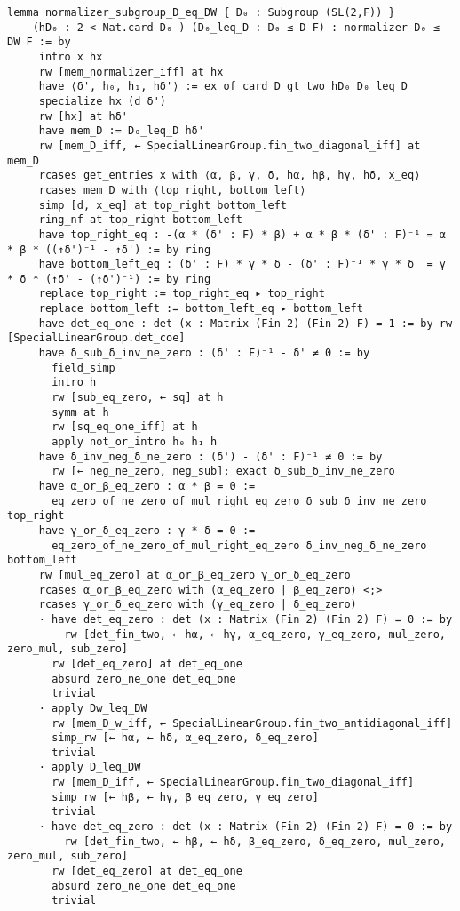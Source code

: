 \begin{footnotesize}
\begin{verbatim}
lemma normalizer_subgroup_D_eq_DW { D₀ : Subgroup (SL(2,F)) }
    (hD₀ : 2 < Nat.card D₀ ) (D₀_leq_D : D₀ ≤ D F) : normalizer D₀ ≤ DW F := by
     intro x hx
     rw [mem_normalizer_iff] at hx
     have ⟨δ', h₀, h₁, hδ'⟩ := ex_of_card_D_gt_two hD₀ D₀_leq_D
     specialize hx (d δ')
     rw [hx] at hδ'
     have mem_D := D₀_leq_D hδ'
     rw [mem_D_iff, ← SpecialLinearGroup.fin_two_diagonal_iff] at mem_D
     rcases get_entries x with ⟨α, β, γ, δ, hα, hβ, hγ, hδ, x_eq⟩
     rcases mem_D with ⟨top_right, bottom_left⟩
     simp [d, x_eq] at top_right bottom_left
     ring_nf at top_right bottom_left
     have top_right_eq : -(α * (δ' : F) * β) + α * β * (δ' : F)⁻¹ = α * β * ((↑δ')⁻¹ - ↑δ') := by ring
     have bottom_left_eq : (δ' : F) * γ * δ - (δ' : F)⁻¹ * γ * δ  = γ * δ * (↑δ' - (↑δ')⁻¹) := by ring
     replace top_right := top_right_eq ▸ top_right
     replace bottom_left := bottom_left_eq ▸ bottom_left
     have det_eq_one : det (x : Matrix (Fin 2) (Fin 2) F) = 1 := by rw [SpecialLinearGroup.det_coe]
     have δ_sub_δ_inv_ne_zero : (δ' : F)⁻¹ - δ' ≠ 0 := by
       field_simp
       intro h
       rw [sub_eq_zero, ← sq] at h
       symm at h
       rw [sq_eq_one_iff] at h
       apply not_or_intro h₀ h₁ h
     have δ_inv_neg_δ_ne_zero : (δ') - (δ' : F)⁻¹ ≠ 0 := by
       rw [← neg_ne_zero, neg_sub]; exact δ_sub_δ_inv_ne_zero
     have α_or_β_eq_zero : α * β = 0 :=
       eq_zero_of_ne_zero_of_mul_right_eq_zero δ_sub_δ_inv_ne_zero top_right
     have γ_or_δ_eq_zero : γ * δ = 0 :=
       eq_zero_of_ne_zero_of_mul_right_eq_zero δ_inv_neg_δ_ne_zero bottom_left
     rw [mul_eq_zero] at α_or_β_eq_zero γ_or_δ_eq_zero
     rcases α_or_β_eq_zero with (α_eq_zero | β_eq_zero) <;>
     rcases γ_or_δ_eq_zero with (γ_eq_zero | δ_eq_zero)
     · have det_eq_zero : det (x : Matrix (Fin 2) (Fin 2) F) = 0 := by
         rw [det_fin_two, ← hα, ← hγ, α_eq_zero, γ_eq_zero, mul_zero, zero_mul, sub_zero]
       rw [det_eq_zero] at det_eq_one
       absurd zero_ne_one det_eq_one
       trivial
     · apply Dw_leq_DW
       rw [mem_D_w_iff, ← SpecialLinearGroup.fin_two_antidiagonal_iff]
       simp_rw [← hα, ← hδ, α_eq_zero, δ_eq_zero]
       trivial
     · apply D_leq_DW
       rw [mem_D_iff, ← SpecialLinearGroup.fin_two_diagonal_iff]
       simp_rw [← hβ, ← hγ, β_eq_zero, γ_eq_zero]
       trivial
     · have det_eq_zero : det (x : Matrix (Fin 2) (Fin 2) F) = 0 := by
         rw [det_fin_two, ← hβ, ← hδ, β_eq_zero, δ_eq_zero, mul_zero, zero_mul, sub_zero]
       rw [det_eq_zero] at det_eq_one
       absurd zero_ne_one det_eq_one
       trivial
\end{verbatim}
\end{footnotesize}


